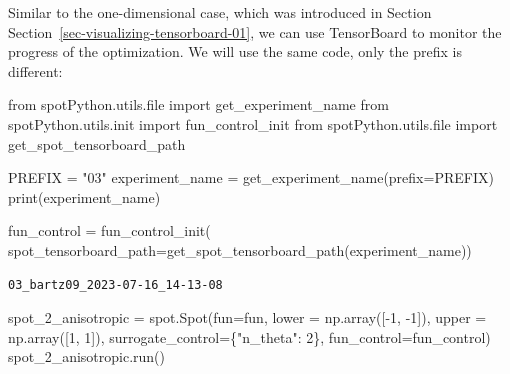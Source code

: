 \documentclass[
  letterpaper,
  DIV=11,
  numbers=noendperiod]{scrreprt}
\newenvironment{Shaded}{\begin{snugshade}}{\end{snugshade}}
\newcommand{\BuiltInTok}[1]{\textcolor[rgb]{0.00,0.23,0.31}{#1}}
\newcommand{\DecValTok}[1]{\textcolor[rgb]{0.68,0.00,0.00}{#1}}
\newcommand{\ImportTok}[1]{\textcolor[rgb]{0.00,0.46,0.62}{#1}}
\newcommand{\NormalTok}[1]{\textcolor[rgb]{0.00,0.23,0.31}{#1}}
\newcommand{\OperatorTok}[1]{\textcolor[rgb]{0.37,0.37,0.37}{#1}}
\newcommand{\StringTok}[1]{\textcolor[rgb]{0.13,0.47,0.30}{#1}}
\begin{document}
\begin{tcolorbox}[enhanced jigsaw, titlerule=0mm, colbacktitle=quarto-callout-note-color!10!white, coltitle=black, arc=.35mm, toptitle=1mm, colback=white, left=2mm, opacityback=0, bottomtitle=1mm, bottomrule=.15mm, breakable, opacitybacktitle=0.6, colframe=quarto-callout-note-color-frame, rightrule=.15mm, toprule=.15mm, leftrule=.75mm, title=\textcolor{quarto-callout-note-color}{\faInfo}\hspace{0.5em}{TensorBoard}]

Similar to the one-dimensional case, which was introduced in Section
Section~\ref{sec-visualizing-tensorboard-01}, we can use TensorBoard to
monitor the progress of the optimization. We will use the same code,
only the prefix is different:

\begin{Shaded}
\begin{Highlighting}[]
\ImportTok{from}\NormalTok{ spotPython.utils.}\BuiltInTok{file} \ImportTok{import}\NormalTok{ get\_experiment\_name}
\ImportTok{from}\NormalTok{ spotPython.utils.init }\ImportTok{import}\NormalTok{ fun\_control\_init}
\ImportTok{from}\NormalTok{ spotPython.utils.}\BuiltInTok{file} \ImportTok{import}\NormalTok{ get\_spot\_tensorboard\_path}

\NormalTok{PREFIX }\OperatorTok{=} \StringTok{"03"}
\NormalTok{experiment\_name }\OperatorTok{=}\NormalTok{ get\_experiment\_name(prefix}\OperatorTok{=}\NormalTok{PREFIX)}
\BuiltInTok{print}\NormalTok{(experiment\_name)}

\NormalTok{fun\_control }\OperatorTok{=}\NormalTok{ fun\_control\_init(}
\NormalTok{    spot\_tensorboard\_path}\OperatorTok{=}\NormalTok{get\_spot\_tensorboard\_path(experiment\_name))}
\end{Highlighting}
\end{Shaded}

\begin{verbatim}
03_bartz09_2023-07-16_14-13-08
\end{verbatim}

\end{tcolorbox}

\begin{Shaded}
\begin{Highlighting}[]
\NormalTok{spot\_2\_anisotropic }\OperatorTok{=}\NormalTok{ spot.Spot(fun}\OperatorTok{=}\NormalTok{fun,}
\NormalTok{                   lower }\OperatorTok{=}\NormalTok{ np.array([}\OperatorTok{{-}}\DecValTok{1}\NormalTok{, }\OperatorTok{{-}}\DecValTok{1}\NormalTok{]),}
\NormalTok{                   upper }\OperatorTok{=}\NormalTok{ np.array([}\DecValTok{1}\NormalTok{, }\DecValTok{1}\NormalTok{]),}
\NormalTok{                   surrogate\_control}\OperatorTok{=}\NormalTok{\{}\StringTok{"n\_theta"}\NormalTok{: }\DecValTok{2}\NormalTok{\},}
\NormalTok{                   fun\_control}\OperatorTok{=}\NormalTok{fun\_control)}
\NormalTok{spot\_2\_anisotropic.run()}
\end{Highlighting}
\end{Shaded}
\end{document}

